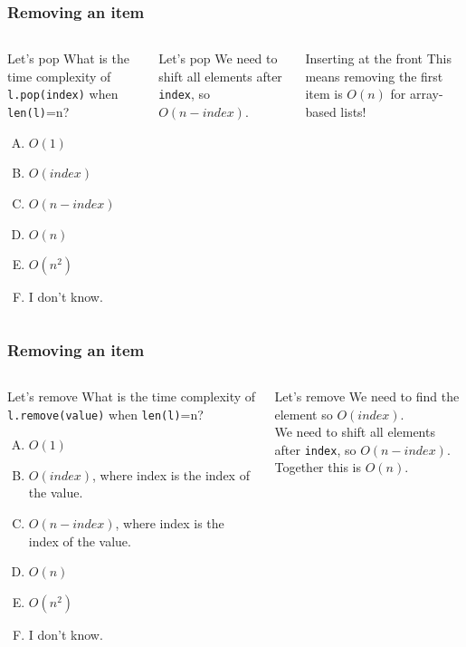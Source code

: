 \begin{frame}
	\frametitle{Removing an item}
	\begin{columns}
		\begin{questionblock}{Let's pop}
			What is the time complexity of \texttt{l.pop(index)} when \texttt{len(l)}=n?
			\begin{enumerate}[A.]
				\item $O(1)$
				\item $O(\textit{index})$
				\item $O(n - \textit{index})$
				\item $O(n)$
				\item $O(n^2)$
				\item I don't know.
			\end{enumerate}
		\end{questionblock}
		\pause
		\begin{answerblock}{Let's pop}
			We need to shift all elements after \texttt{index}, so $O(n-\textit{index})$.
		\end{answerblock}
		\pause
		\begin{alertblock}{Inserting at the front}
			This means removing the first item is $O(n)$ for array-based lists!
		\end{alertblock}	
	\end{columns}
\end{frame}

\begin{frame}
	\frametitle{Removing an item}
	\begin{columns}
		\column{0.455\textwidth}
		\begin{questionblock}{Let's remove}
			What is the time complexity of \texttt{l.remove(value)} when \texttt{len(l)}=n?
			\begin{enumerate}[A.]
				\item $O(1)$
				\item $O(\textit{index})$, where index is the index of the value.
				\item $O(n - \textit{index})$, where index is the index of the value.
				\item $O(n)$
				\item $O(n^2)$
				\item I don't know.
			\end{enumerate}
		\end{questionblock}
		\pause
		\column{0.455\textwidth}
		\begin{answerblock}{Let's remove}
			We need to find the element so $O(\textit{index})$.\\
			We need to shift all elements after \texttt{index}, so $O(n-\textit{index})$.\\
			Together this is $O(n)$.
		\end{answerblock}
	\end{columns}
\end{frame}

